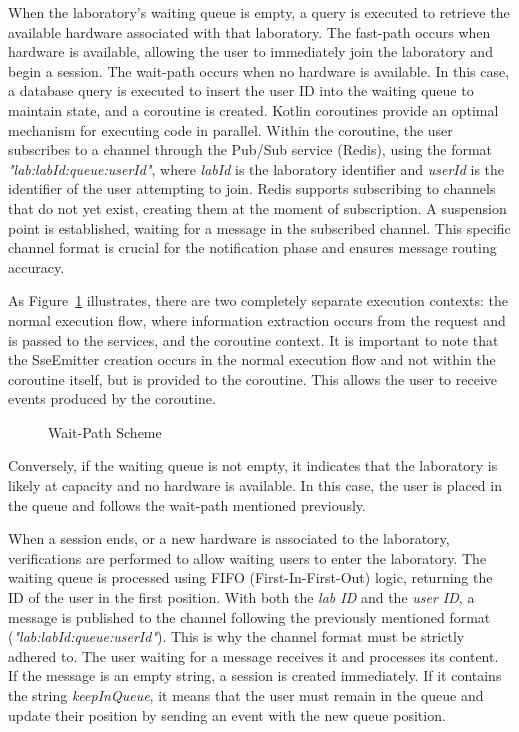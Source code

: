 When the laboratory's waiting queue is empty, a query is executed to retrieve the available hardware associated with that laboratory. The fast-path occurs when hardware is available, allowing the user to immediately join the laboratory and begin a session. The wait-path occurs when no hardware is available. In this case, a database query is executed to insert the user ID into the waiting queue to maintain state, and a coroutine is created. Kotlin coroutines provide an optimal mechanism for executing code in parallel. Within the coroutine, the user subscribes to a channel through the Pub/Sub service (Redis), using the format \textit{"lab:labId:queue:userId"}, where \textit{labId} is the laboratory identifier and \textit{userId} is the identifier of the user attempting to join. Redis supports subscribing to channels that do not yet exist, creating them at the moment of subscription. A suspension point is established, waiting for a message in the subscribed channel. This specific channel format is crucial for the notification phase and ensures message routing accuracy.

As Figure~\ref{fig:wait-path-scheme} illustrates, there are two completely separate execution contexts: the normal execution flow, where information extraction occurs from the request and is passed to the services, and the coroutine context. It is important to note that the SseEmitter creation occurs in the normal execution flow and not within the coroutine itself, but is provided to the coroutine. This allows the user to receive events produced by the coroutine.

\begin{figure}[H]
    \centering
    
    \caption{Wait-Path Scheme}
    \label{fig:wait-path-scheme}
\end{figure}

Conversely, if the waiting queue is not empty, it indicates that the laboratory is likely at capacity and no hardware is available. In this case, the user is placed in the queue and follows the wait-path mentioned previously.

When a session ends, or a new hardware is associated to the laboratory, verifications are performed to allow waiting users to enter the laboratory. The waiting queue is processed using FIFO (First-In-First-Out) logic, returning the ID of the user in the first position. With both the \textit{lab ID} and the \textit{user ID}, a message is published to the channel following the previously mentioned format (\textit{"lab:labId:queue:userId"}). This is why the channel format must be strictly adhered to. The user waiting for a message receives it and processes its content. If the message is an empty string, a session is created immediately. If it contains the string \textit{keepInQueue}, it means that the user must remain in the queue and update their position by sending an event with the new queue position.

